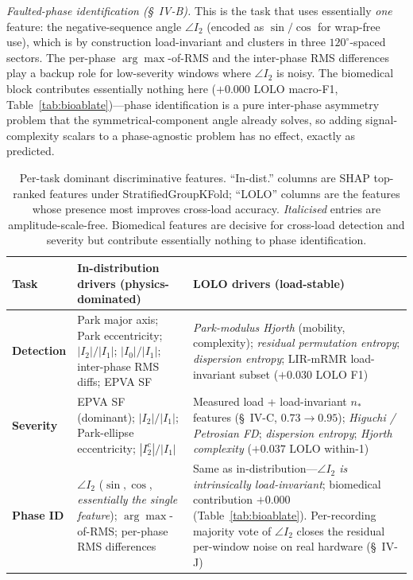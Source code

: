 \documentclass[journal]{IEEEtran}
\begin{document}
\emph{Faulted-phase identification (\S~IV-B).} This is the task that uses essentially
\emph{one} feature: the negative-sequence angle $\angle I_2$ (encoded as $\sin/\cos$ for
wrap-free use), which is by construction load-invariant and clusters in three
$120^\circ$-spaced sectors. The per-phase $\arg\max$-of-RMS and the inter-phase RMS
differences play a backup role for low-severity windows where $\angle I_2$ is noisy. The
biomedical block contributes essentially nothing here ($+0.000$ LOLO macro-F1,
Table~\ref{tab:bioablate})---phase identification is a pure inter-phase asymmetry problem
that the symmetrical-component angle already solves, so adding signal-complexity scalars
to a phase-agnostic problem has no effect, exactly as predicted.

\begin{table}[!t]
\caption{Per-task dominant discriminative features. ``In-dist.'' columns are SHAP top-ranked
features under StratifiedGroupKFold; ``LOLO'' columns are the features whose presence most
improves cross-load accuracy. \textit{Italicised} entries are amplitude-scale-free.
Biomedical features are decisive for cross-load detection and severity but contribute
essentially nothing to phase identification.}
\label{tab:discfeat}
\centering
\footnotesize
\begin{tabular}{@{}p{}p{}p{}@{}}
\toprule
Task & In-distribution drivers (physics-dominated) & LOLO drivers (load-stable) \\
\midrule
\textbf{Detection}
& Park major axis; Park eccentricity; $|I_2|/|I_1|$; $|I_0|/|I_1|$; inter-phase RMS diffs;
  EPVA SF
& \emph{Park-modulus Hjorth} (mobility, complexity); \emph{residual permutation entropy};
  \emph{dispersion entropy}; $\mathrm{LIR\text{-}mRMR}$ load-invariant subset
  ($+0.030$ LOLO F1) \\
\midrule
\textbf{Severity}
& EPVA SF (dominant); $|I_2|/|I_1|$; Park-ellipse eccentricity; $|I_2^c|/|I_1|$
& Measured load + load-invariant $n_{\!*}$ features (\S~IV-C, $0.73\!\rightarrow\!0.95$);
  \emph{Higuchi / Petrosian FD}; \emph{dispersion entropy}; \emph{Hjorth complexity}
  ($+0.037$ LOLO within-1) \\
\midrule
\textbf{Phase ID}
& $\angle I_2$ ($\sin, \cos$, \emph{essentially the single feature}); $\arg\max$-of-RMS;
  per-phase RMS differences
& Same as in-distribution---\emph{$\angle I_2$ is intrinsically load-invariant}; biomedical
  contribution $+0.000$ (Table~\ref{tab:bioablate}). Per-recording majority vote of $\angle I_2$
  closes the residual per-window noise on real hardware (\S~IV-J) \\
\bottomrule
\end{tabular}
\end{table}
\end{document}
